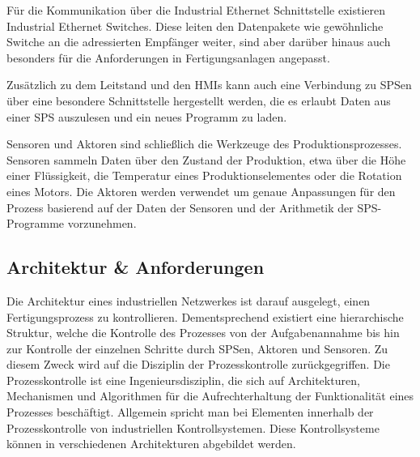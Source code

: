 Für die Kommunikation über die Industrial Ethernet Schnittstelle existieren Industrial Ethernet Switches. Diese leiten den Datenpakete wie gewöhnliche Switche an die adressierten Empfänger weiter, sind aber darüber hinaus auch besonders für die Anforderungen in Fertigungsanlagen angepasst.

Zusätzlich zu dem Leitstand und den HMIs kann auch eine Verbindung zu SPSen über eine besondere Schnittstelle hergestellt werden, die es erlaubt Daten aus einer SPS auszulesen und ein neues Programm zu laden. 

Sensoren und Aktoren sind schließlich die Werkzeuge des Produktionsprozesses. Sensoren sammeln Daten über den Zustand der Produktion, etwa über die Höhe einer Flüssigkeit, die Temperatur eines Produktionselementes oder die Rotation eines Motors. Die Aktoren werden verwendet um genaue Anpassungen für den Prozess basierend auf der Daten der Sensoren und der Arithmetik der SPS-Programme vorzunehmen.

\subsection{Architektur \&  Anforderungen}
Die Architektur eines industriellen Netzwerkes ist darauf ausgelegt, einen Fertigungsprozess zu kontrollieren. Dementsprechend existiert eine hierarchische Struktur, welche die Kontrolle des Prozesses von der Aufgabenannahme bis hin zur Kontrolle der einzelnen Schritte durch SPSen, Aktoren und Sensoren. Zu diesem Zweck wird auf die Disziplin der Prozesskontrolle zurückgegriffen. Die Prozesskontrolle ist eine Ingenieursdisziplin, die sich auf Architekturen, Mechanismen und Algorithmen für die Aufrechterhaltung der Funktionalität eines Prozesses beschäftigt. Allgemein spricht man bei Elementen innerhalb der Prozesskontrolle von industriellen Kontrollsystemen. Diese Kontrollsysteme können in verschiedenen Architekturen abgebildet werden.

